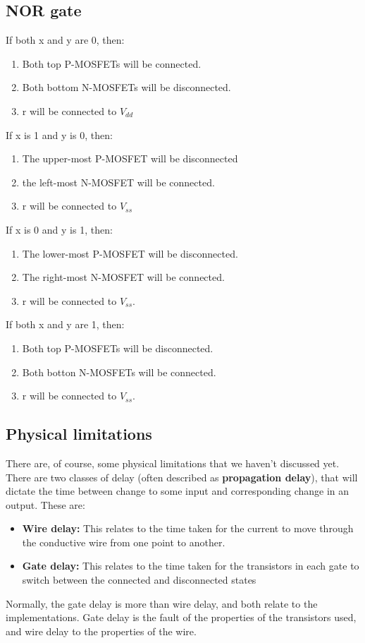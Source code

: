 \documentclass[11pt,a4paper,titlepage,dvipsnames,cmyk]{scrartcl}
\begin{document}
\subsection{NOR gate}%
\label{sub:nor}
If both x and y are 0, then:
\begin{enumerate}
    \item Both top P-MOSFETs will be connected.
    \item Both bottom N-MOSFETs will be disconnected.
    \item r will be connected to $V_{dd}$
\end{enumerate}

If x is 1 and y is 0, then:
\begin{enumerate}
    \item The upper-most P-MOSFET will be disconnected
    \item the left-most N-MOSFET will be connected.
    \item r will be connected to $V_{ss}$
\end{enumerate}

If x is 0 and y is 1, then:
\begin{enumerate}
    \item The lower-most P-MOSFET will be disconnected.
    \item The right-most N-MOSFET will be connected.
    \item r will be connected to $V_{ss}$.
\end{enumerate}

If both x and y are 1, then:
\begin{enumerate}
    \item Both top P-MOSFETs will be disconnected.
    \item Both botton N-MOSFETs will be connected.
    \item r will be connected to $V_{ss}$.
\end{enumerate}

\subsection{Physical limitations}%
\label{sub:Physical limitations}
There are, of course, some physical limitations that we haven't discussed
yet. There are two classes of delay (often described as
\textbf{propagation delay}), that will dictate the time between change to
some input and corresponding change in an output. These are:
\begin{itemize}
    \item \textbf{Wire delay:} This relates to the time taken for the
        current to move through the conductive wire from one point to
        another.
    \item \textbf{Gate delay:} This relates to the time taken for the
        transistors in each gate to switch between the connected and
        disconnected states
\end{itemize}
Normally, the gate delay is more than wire delay, and both relate to the
implementations. Gate delay is the fault of the properties of the
transistors used, and wire delay to the properties of the wire.
\end{document}
